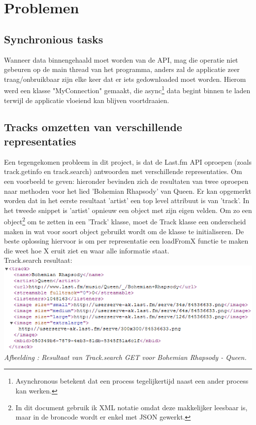 \documentclass[11pt,a4paper]{article}
\newcounter{figc}
\newcommand{\figID} {%
   \stepcounter{figc}%
   \thefigc}
\begin{document}
	

\section{Problemen}
	\subsection{Synchronious tasks}
	Wanneer data binnengehaald moet worden van de API, mag die operatie niet gebeuren op de main thread van het programma, anders zal de applicatie zeer traag/onbruikbaar zijn elke keer dat er iets gedownloaded moet worden. Hierom werd een klasse "MyConnection" gemaakt, die async\footnote{Asynchronous betekent dat een process tegelijkertijd naast een ander process kan werken.} data begint binnen te laden terwijl de applicatie vloeiend kan blijven voortdraaien.
	\subsection{Tracks omzetten van verschillende representaties}
	Een tegengekomen probleem in dit project, is dat de Last.fm API oproepen (zoals track.getinfo en track.search) antwoorden met verschillende representaties. Om een voorbeeld te geven: hieronder bevinden zich de resultaten van twee oproepen naar methoden voor het lied 'Bohemian Rhapsody' van Queen. Er kan opgemerkt worden dat in het eerste resultaat 'artist' een top level attribuut is van 'track'. In het tweede snippet is 'artist' opnieuw een object met zijn eigen velden. Om zo een object\footnote{In dit document gebruik ik XML notatie omdat deze makkelijker leesbaar is, maar in de broncode wordt er enkel met JSON gewerkt.} om te zetten in een 'Track' klasse, moet de Track klasse een onderscheid maken in wat voor soort object gebruikt wordt om de klasse te initialiseren. De beste oplossing hiervoor is om per representatie een loadFromX functie te maken die weet hoe X eruit ziet en waar alle informatie staat. \\
	
	Track.search resultaat:\\
	\includegraphics[width=15cm]{track_search.png} \\ \newline
	\small \textit{Afbeelding \figID : Resultaat van Track.search GET voor Bohemian Rhapsody - Queen.} \\
\end{document}

